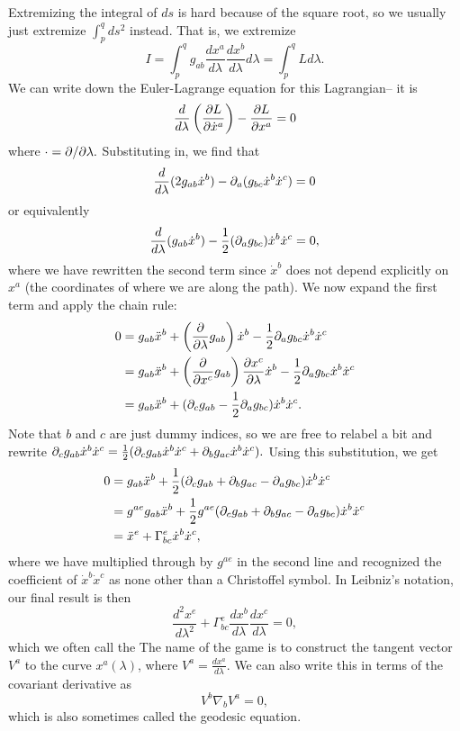 Extremizing the integral of $ds$ is hard because of the square root, so we usually just extremize $\int_p^q ds^2$ instead. That is, we extremize
$$I=\int_p^q g_{ab}\frac{dx^a}{d\lambda} \frac{dx^b}{d\lambda} d\lambda= \int_p^q L d\lambda.$$
We can write down the Euler-Lagrange equation for this Lagrangian-- it is
$$\frac{d}{d\lambda} \left(\frac{\partial L}{\partial \dot x^a}\right)- \frac{\partial L}{\partial x^a}=0$$
where $\cdot = \partial/\partial\lambda.$
Substituting in, we find that
$$\frac{d}{d\lambda}(2g_{ab}\dot x^{b}) -\partial_a (g_{bc} \dot x^b \dot x^c) =0$$
or equivalently
$$\frac{d}{d\lambda}(g_{ab}\dot x^b)-\frac{1}{2}(\partial_a g_{bc})\dot x^b \dot x^c =0,$$
where we have rewritten the second term since $\dot x^b$ does not depend explicitly on $x^a$ (the coordinates of where we are along the path). 
We now expand the first term and apply the chain rule:
\begin{align*}
    0&=g_{ab}\ddot x^b +\left(\frac{\partial }{\partial \lambda} g_{ab}\right) \dot x^b-\frac{1}{2}\partial_a g_{bc} \dot x^b \dot x^c\\
    &=g_{ab}\ddot x^b +\left(\frac{\partial}{\partial x^c}g_{ab}\right) \frac{\partial x^c}{\partial \lambda} \dot x^b-\frac{1}{2}\partial_a g_{bc} \dot x^b \dot x^c\\
    &=g_{ab} \ddot x^b + (\partial_c g_{ab}-\frac{1}{2}\partial_a g_{bc})\dot x^b \dot x^c.
\end{align*}
Note that $b$ and $c$ are just dummy indices, so we are free to relabel a bit and rewrite
$\partial_c g_{ab} \dot x^b \dot x^c = \frac{1}{2}(\partial_c g_{ab} \dot x^b \dot x^c + \partial_b g_{ac} \dot x^b \dot x^c).$
Using this substitution, we get
\begin{align*}
    0&=g_{ab} \ddot x^b +\frac{1}{2}(\partial_c g_{ab}+\partial_b g_{ac}-\partial_a g_{bc})\dot x^b \dot x^c\\
    &=g^{ae}g_{ab} \ddot x^b +\frac{1}{2} g^{ae}(\partial_c g_{ab}+\partial_b g_{ac}-\partial_a g_{bc})\dot x^b \dot x^c\\
    &= \ddot x^e+ \Gamma^e_{bc} \dot x^b \dot x^c,
\end{align*}
where we have multiplied through by $g^{ae}$ in the second line and recognized the coefficient of $\dot x^b \dot x^c$ as none other than a Christoffel symbol. In Leibniz's notation, our final result is then
$$\frac{d^2x^e}{d\lambda^2}+\Gamma^e_{bc}\frac{dx^b}{d\lambda} \frac{dx^c}{d\lambda}=0,$$
which we often call the  The name of the game is to construct the tangent vector $V^a$ to the curve $x^a(\lambda)$, where $V^a=\frac{dx^a}{d\lambda}.$
We can also write this in terms of the covariant derivative as
$$V^b \nabla_b V^a = 0,$$
which is also sometimes called the geodesic equation. 

